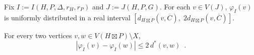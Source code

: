 \documentclass{patmorin}
\renewcommand{\ge}{\geqslant}
\renewcommand{\le}{\leqslant}
\begin{document}


\begin{obs}\label{uniform}
  Fix $I:=I(H,P,\Delta,r_H,r_P)$ and $J:=J(H,P,G)$.  For each $v\in V(J)$,
  $\varphi_I(v)$ is uniformly distributed in a real interval $[d_{H\boxtimes P}(v,\overline{C}),\;2d_{H\boxtimes P}(v,\overline{C})]$.
\end{obs}




\begin{clm}\label{double_distance}
  For every two vertices $v,w\in V(H\boxtimes P)\setminus X$,
  \[
    |\varphi_I(v)-\varphi_I(w)| \le 2\, d^*(v,w) \enspace .
  \]
\end{clm}
\end{document}
